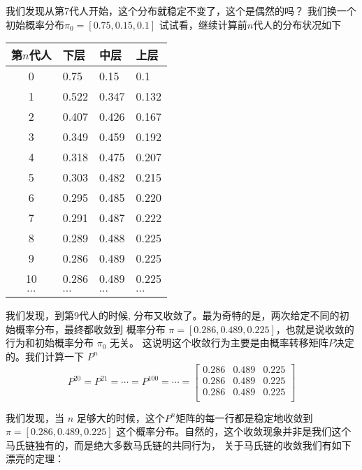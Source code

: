 我们发现从第7代人开始，这个分布就稳定不变了，这个是偶然的吗？
我们换一个初始概率分布$\pi_0 = [0.75,0.15,0.1]$ 试试看，继续计算前$n$代人的分布状况如下
\begin{center}
\begin{tabular}{clll}
第$n$代人 & 下层 & 中层 & 上层 \\
\hline
0 & 0.75 & 0.15 & 0.1 \\
1 & 0.522 & 0.347 & 0.132 \\
2 & 0.407 & 0.426 & 0.167 \\
3 & 0.349 & 0.459 & 0.192 \\
4 & 0.318 & 0.475 & 0.207 \\
5 & 0.303 & 0.482 & 0.215 \\
6 & 0.295 & 0.485 & 0.220 \\
7 & 0.291 & 0.487 & 0.222 \\
8 & 0.289 & 0.488 & 0.225 \\
9 & 0.286 & 0.489 & 0.225 \\
10 & 0.286 & 0.489 & 0.225 \\
$\cdots$  & $\cdots$  & $\cdots$  & $\cdots$  \\
\end{tabular}
\end{center}

我们发现，到第9代人的时候, 分布又收敛了。最为奇特的是，两次给定不同的初始概率分布，最终都收敛到
概率分布 $\pi=[0.286, 0.489, 0.225]$，也就是说收敛的行为和初始概率分布 $\pi_0$ 无关。
这说明这个收敛行为主要是由概率转移矩阵$P$决定的。我们计算一下 $P^n$
$$ P^{20} = P^{21} = \cdots = P^{100} = \cdots =
\begin{bmatrix}
0.286 & 0.489 & 0.225 \\
0.286 & 0.489 & 0.225 \\
0.286 & 0.489 & 0.225 \\
\end{bmatrix}
$$

我们发现，当 $n$ 足够大的时候，这个$P^n$矩阵的每一行都是稳定地收敛到$\pi=[0.286, 0.489, 0.225]$
这个概率分布。自然的，这个收敛现象并非是我们这个马氏链独有的，而是绝大多数马氏链的共同行为，
关于马氏链的收敛我们有如下漂亮的定理：

